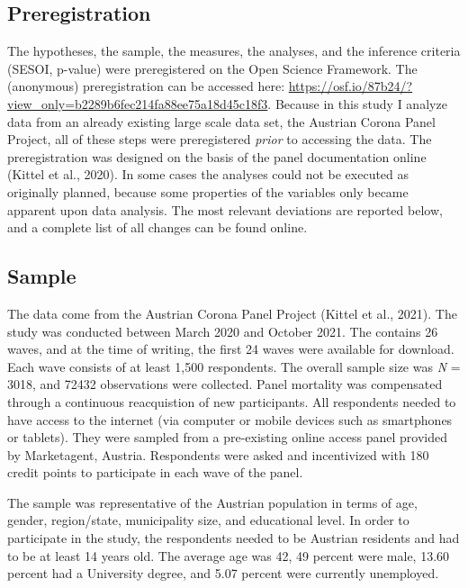 \documentclass[
  english,
  man,floatsintext]{apa6}
\begin{document}
\hypertarget{preregistration}{%
\subsection{Preregistration}\label{preregistration}}

The hypotheses, the sample, the measures, the analyses, and the inference criteria (SESOI, p-value) were preregistered on the Open Science Framework.
The (anonymous) preregistration can be accessed here: \url{https://osf.io/87b24/?view_only=b2289b6fec214fa88ee75a18d45c18f3}.
Because in this study I analyze data from an already existing large scale data set, the Austrian Corona Panel Project, all of these steps were preregistered \emph{prior} to accessing the data.
The preregistration was designed on the basis of the panel documentation online (Kittel et al., 2020).
In some cases the analyses could not be executed as originally planned, because some properties of the variables only became apparent upon data analysis.
The most relevant deviations are reported below, and a complete list of all changes can be found online.

\hypertarget{sample}{%
\subsection{Sample}\label{sample}}

The data come from the Austrian Corona Panel Project (Kittel et al., 2021).
The study was conducted between March 2020 and October 2021.
The contains 26 waves, and at the time of writing, the first 24 waves were available for download.
Each wave consists of at least 1,500 respondents.
The overall sample size was \emph{N} = 3018, and 72432 observations were collected.
Panel mortality was compensated through a continuous reacquistion of new participants.
All respondents needed to have access to the internet (via computer or mobile devices such as smartphones or tablets).
They were sampled from a pre-existing online access panel provided by Marketagent, Austria.
Respondents were asked and incentivized with 180 credit points to participate in each wave of the panel.

The sample was representative of the Austrian population in terms of age, gender, region/state, municipality size, and educational level. In order to participate in the study, the respondents needed to be Austrian residents and had to be at least 14 years old.
The average age was 42, 49 percent were male, 13.60 percent had a University degree, and 5.07 percent were currently unemployed.
\end{document}
